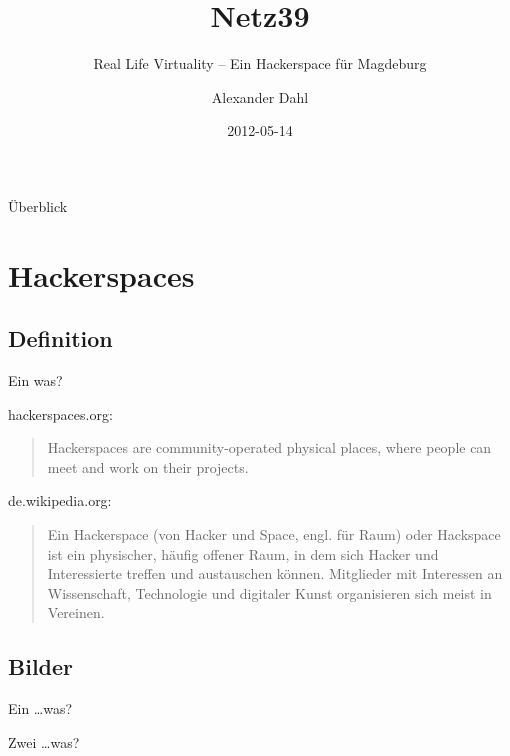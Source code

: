 \documentclass[hyperref={pdfpagelabels=false}]{beamer}
\title[Netz39]{Netz39}
\subtitle{Real Life Virtuality -- Ein Hackerspace für Magdeburg}
\author{Alexander Dahl}
\institute[netz39.de]{\url{http://www.netz39.de/}}
\date{2012-05-14}
\begin{document}
\begin{frame}
	\titlepage
\end{frame}

\begin{frame}{Überblick}
    \tableofcontents
\end{frame}

\section{Hackerspaces}

\subsection{Definition}

\begin{frame}{Ein was?}
    \begin{block}{hackerspaces.org:}
        \begin{quote}
            Hackerspaces are community-operated physical places, where people
            can meet and work on their projects.
        \end{quote}
    \end{block}
    \pause
    \begin{block}{de.wikipedia.org:}
        \begin{quote}
            Ein Hackerspace (von Hacker und Space, engl. für Raum) oder
            Hackspace ist ein physischer, häufig offener Raum, in dem sich
            Hacker und Interessierte treffen und austauschen können.
            Mitglieder mit Interessen an Wissenschaft, Technologie und
            digitaler Kunst organisieren sich meist in Vereinen.
        \end{quote}
    \end{block}
\end{frame}

\subsection{Bilder}

\begin{frame}[label=secbaellebad]{Ein \dots was?}
    \begin{figure}
    \end{figure}
\end{frame}

\begin{frame}[label=secddr]{Zwei \dots was?}
    \begin{figure}
    \end{figure}
\end{frame}
\end{document}
